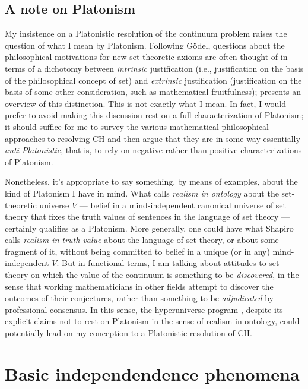 \documentclass[letterpaper,12pt]{article}
\begin{document}
\subsection{A note on Platonism}
My insistence on a Platonistic resolution of the continuum problem raises the question of what I mean by Platonism. Following G\"odel, questions about the philosophical motivations for new set-theoretic axioms are often thought of in terms of a dichotomy between \emph{intrinsic} justification (i.e., justification on the basis of the philosophical concept of set) and \emph{extrinsic} justification (justification on the basis of some other consideration, such as mathematical fruitfulness); \cite{koellner2009reflection} presents an overview of this distinction. This is not exactly what I mean. In fact, I would prefer to avoid making this discussion rest on a full characterization of Platonism; it should suffice for me to survey the various mathematical-philosophical approaches to resolving CH and then argue that they are in some way essentially \emph{anti-Platonistic}, that is, to rely on negative rather than positive characterizations of Platonism.

Nonetheless, it's appropriate to say something, by means of examples, about the kind of Platonism I have in mind. What \cite{Shapiro2000-SHATAM} calls \emph{realism in ontology} about the set-theoretic universe $V$ --- belief in a mind-independent canonical universe of set theory that fixes the truth values of sentences in the language of set theory --- certainly qualifies as a Platonism. More generally, one could have what Shapiro calls \emph{realism in truth-value} about the language of set theory, or about some fragment of it, without being committed to belief in a unique (or in any) mind-independent $V$. But in functional terms, I am talking about attitudes to set theory on which the value of the continuum is something to be \emph{discovered}, in the sense that working mathematicians in other fields attempt to discover the outcomes of their conjectures, rather than something to be \emph{adjudicated} by professional consensus. In this sense, the hyperuniverse program \citep{arrigoni2013hyperuniverse}, despite its explicit claims not to rest on Platonism in the sense of realism-in-ontology, could potentially lead on my conception to a Platonistic resolution of CH.

\section{Basic independendence phenomena}
\end{document}

